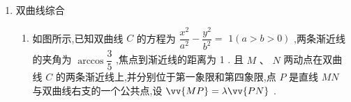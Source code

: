\begin{enumerate}
\begin{enumerate}
\begin{jieda}
\begin{enumerate}
                    联立$\left\{  \begin{array}{l} y = {kx} + \sqrt{3} \\  2{y}^{2} - {x}^{2} = 2 \end{array}\right.$ 消去 $y$ ,得 $\left( {2{k}^{2} - 1}\right) {x}^{2} + 4\sqrt{3}{kx} + 4 = 0,\left\{  \begin{array}{l} 2{k}^{2} - 1 \neq  0 \\  \Delta  = {16}\left( {k^{2} + 1}\right)  > 0 \end{array}\right.$
                    
                    由韦达定理有$\left\{\begin{array}{l}
                        {x}_P + {x}_Q =  - \dfrac{4\sqrt{3}k}{2{k}^{2} - 1} \\
                        {x}_P{x}_Q = \dfrac{4}{2{k}^{2} - 1}
                    \end{array}\right.$

                    代入可得$4k^2+2\sqrt{3}(-4\sqrt{3}k) = -15(2k^2-1)$或$-9(2k^2-1)$，即$-20k^2 = 15-30k^2$或$9-18k^2$（舍）

                    故$k^2 = \dfrac{3}{2}$，故存在直线$n: y = \pm \dfrac{\sqrt{6}}{2}x+\sqrt{3}$
            \end{enumerate}
        \end{jieda}
    \end{enumerate}
    \item 双曲线综合
    \begin{enumerate}   
        \item 如图所示,已知双曲线 $C$ 的方程为 $\dfrac{{x}^{2}}{{a}^{2}} - \dfrac{{y}^{2}}{{b}^{2}} =$  $1\left( {a > b > 0}\right)$ ,两条渐近线的夹角为 $\arccos \dfrac{3}{5}$ ,焦点到渐近线的距离为 1 . 且 $M\text{ 、 }N$ 两动点在双曲线 $C$ 的两条渐近线上,并分别位于第一象限和第四象限,点 $P$ 是直线 ${MN}$ 与双曲线右支的一个公共点,设 $\vv{MP} = \lambda \vv{PN}$ .
        

\end{enumerate}
\end{enumerate}
